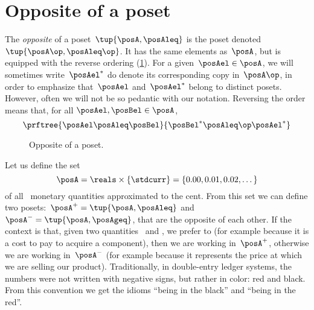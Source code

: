 \section{Opposite of a poset}\label{sec:opposite-of-a-poset}

\begin{definition}
  \label{def:poset-opposite}
  The \emph{opposite} of a poset~$\tup{\posA, \posAleq}$ is the poset denoted~$\tup{\posA\op, \posAleq\op}$. It has the same elements as~$\posA$, but is equipped with the reverse ordering (\cref{fig:poset-opposite}).
  For a given~$\posAel \in \posA$, we will sometimes write~$\posAel^*$ do denote its corresponding copy in~$\posA\op$, in order to emphasize that~$\posAel$ and~$\posAel^*$ belong to distinct posets. However, often we will not be so pedantic with our notation. 
  Reversing the order means that, for all $\posAel,\posBel\in \posA$,
  \begin{equation}
    \prftree{\posAel \posAleq \posBel}{\posBel^* \posAleq\op \posAel^*}
  \end{equation}
\end{definition}

\begin{figure}[tbh]
  \centering
  \caption{Opposite of a poset.}
  \label{fig:poset-opposite}
\end{figure}

\begin{example}
  Let us define the set
  \begin{equation*}
    \posA=\reals \times \{\stdcurr\}=\{0.00,0.01,0.02,\dots\}
  \end{equation*}
  of all \stdcurr \ monetary quantities approximated to the cent.
  From this set we can define two posets:~$\posA^{+} = \tup{\posA, \posAleq}$ and~$\posA^{-} = \tup{\posA, \posAgeq}$, that are the opposite of each other.
  If the context is that, given two quantities~\unit[1]{\stdcurr} and \unit[2]{\stdcurr}, we prefer \unit[1]{\stdcurr} to \unit[2]{\stdcurr} (for example because it is a cost to pay to acquire a component), then we are working in~$\posA^{+}$, otherwise we are working in~$\posA^{-}$ (for example because it represents the price at which we are selling our product).
  Traditionally, in double-entry ledger systems, the numbers were not written with negative signs, but rather in color: red and black. From this convention we get the idioms ``being in the black'' and ``being in the red''.
\end{example}